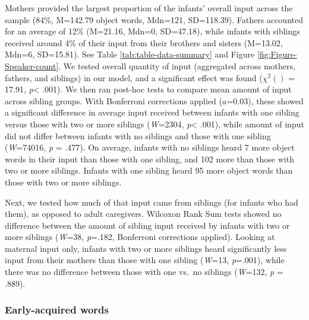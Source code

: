 \documentclass[
  english,
  man,floatsintext]{apa6}
\begin{document}
Mothers provided the largest proportion of the infants' overall input across the sample (84\%, M=142.79 object words, Mdn=121, SD=118.39). Fathers accounted for an average of 12\% (M=21.16, Mdn=0, SD=47.18), while infants with siblings received around 4\% of their input from their brothers and sisters (M=13.02, Mdn=6, SD=15.81). See Table \ref{tab:table-data-summary} and Figure \ref{fig:Figure-Speaker-count}. We tested overall quantity of input (aggregated across mothers, fathers, and siblings) in our model, and a significant effect was found (\(\chi^2 ()\) = 17.91, \emph{p}\textless{} .001). We then ran post-hoc tests to compare mean amount of input across sibling groups. With Bonferroni corrections applied (\(a\)=0.03), these showed a significant difference in average input received between infants with one sibling versus those with two or more siblings (\emph{W}=2304, \emph{p}\textless{} .001), while amount of input did not differ between infants with no siblings and those with one sibling (\emph{W}=74016, \emph{p} = .477). On average, infants with no siblings heard 7 more object words in their input than those with one sibling, and 102 more than those with two or more siblings. Infants with one sibling heard 95 more object words than those with two or more siblings.

Next, we tested how much of that input came from siblings (for infants who had them), as opposed to adult caregivers. Wilcoxon Rank Sum tests showed no difference between the amount of sibling input received by infants with two or more siblings (\emph{W}=38, \emph{p}=.182, Bonferroni corrections applied). Looking at maternal input only, infants with two or more siblings heard significantly less input from their mothers than those with one sibling (\emph{W}=13, \emph{p}=.001), while there was no difference between those with one vs.~no siblings (\emph{W}=132, \emph{p} = .889).

\hypertarget{early-acquired-words}{%
\subsubsection{Early-acquired words}\label{early-acquired-words}}
\end{document}
